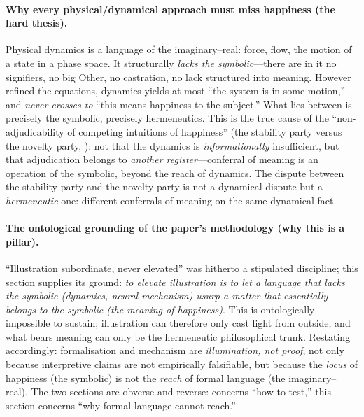 \paragraph{Why every physical/dynamical approach must miss happiness (the hard thesis).} Physical dynamics is a language of the imaginary--real: force, flow, the motion of a state in a phase space. It structurally \emph{lacks the symbolic}---there are in it no signifiers, no big Other, no castration, no lack structured into meaning. However refined the equations, dynamics yields at most ``the system is in some motion,'' and \emph{never crosses to} ``this means happiness to the subject.'' What lies between is precisely the symbolic, precisely hermeneutics. This is the true cause of the ``non-adjudicability of competing intuitions of happiness'' (the stability party versus the novelty party, ): not that the dynamics is \emph{informationally} insufficient, but that adjudication belongs to \emph{another register}---conferral of meaning is an operation of the symbolic, beyond the reach of dynamics. The dispute between the stability party and the novelty party is not a dynamical dispute but a \emph{hermeneutic} one: different conferrals of meaning on the same dynamical fact.

\paragraph{The ontological grounding of the paper's methodology (why this is a pillar).} ``Illustration subordinate, never elevated'' was hitherto a stipulated discipline; this section supplies its ground: \emph{to elevate illustration is to let a language that lacks the symbolic (dynamics, neural mechanism) usurp a matter that essentially belongs to the symbolic (the meaning of happiness)}. This is ontologically impossible to sustain; illustration can therefore only cast light from outside, and what bears meaning can only be the hermeneutic philosophical trunk. Restating  accordingly: formalisation and mechanism are \emph{illumination, not proof}, not only because interpretive claims are not empirically falsifiable, but because the \emph{locus} of happiness (the symbolic) is not the \emph{reach} of formal language (the imaginary--real). The two sections are obverse and reverse:  concerns ``how to test,'' this section concerns ``why formal language cannot reach.''

